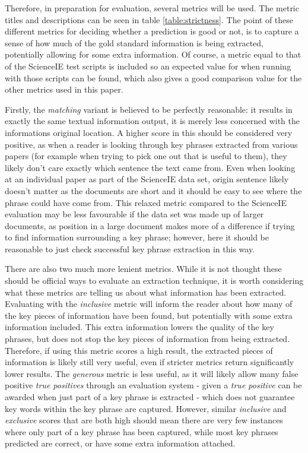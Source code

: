 Therefore, in preparation for evaluation, several metrics will be used. The metric titles and descriptions can be seen in table \ref{table:strictness}. The point of these different metrics for deciding whether a prediction is good or not, is to capture a sense of how much of the gold standard information is being extracted, potentially allowing for some extra information. Of course, a metric equal to that of the ScienceIE test scripts is included so an expected value for when running with those scripts can be found, which also gives a good comparison value for the other metrics used in this paper.

Firstly, the \textit{matching} variant is believed to be perfectly reasonable: it results in exactly the same textual information output, it is merely less concerned with the informations original location. A higher score in this should be considered very positive, as when a reader is looking through key phrases extracted from various papers (for example when trying to pick one out that is useful to them), they likely don't care exactly which sentence the text came from. Even when looking at an individual paper as part of the ScienceIE data set, origin sentence likely doesn't matter as the documents are short and it should be easy to see where the phrase could have come from. This relaxed metric compared to the ScienceIE evaluation may be less favourable if the data set was made up of larger documents, as position in a large document makes more of a difference if trying to find information surrounding a key phrase; however, here it should be reasonable to just check successful key phrase extraction in this way.

There are also two much more lenient metrics. While it is not thought these should be official ways to evaluate an extraction technique, it is worth considering what these metrics are telling us about what information has been extracted. Evaluating with the \textit{inclusive} metric will inform the reader about how many of the key pieces of information have been found, but potentially with some extra information included. This extra information lowers the quality of the key phrases, but does not stop the key pieces of information from being extracted. Therefore, if using this metric scores a high result, the extracted pieces of information is likely still very useful, even if stricter metrics return significantly lower results. The \textit{generous} metric is less useful, as it will likely allow many false positive \textit{true positives} through an evaluation system - given a \textit{true positive} can be awarded when just part of a key phrase is extracted - which does not guarantee key words within the key phrase are captured. However, similar \textit{inclusive} and \textit{exclusive} scores that are both high should mean there are very few instances where only part of a key phrase has been captured, while most key phrases predicted are correct, or have some extra information attached.

